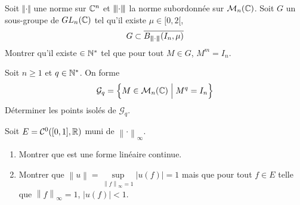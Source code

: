 \documentclass[12pt]{article}
\begin{document}
\begin{exercise}
	Soit $\Vert\cdot\Vert$ une norme sur $\mathbb{C}^{n}$ et ${\left\vert\kern-0.25ex\left\vert\kern-0.25ex\left\vert{}\cdot \right\vert\kern-0.25ex\right\vert\kern-0.25ex\right\vert}$ la norme subordonnée sur $\mathcal{M}_{n}(\mathbb{C})$. Soit $G$ un sous-groupe de $GL_{n}(\mathbb{C})$ tel qu'il existe $\mu\in[0,2[$,
	$$G\subset\overline{B_{{\left\vert\kern-0.25ex\left\vert\kern-0.25ex\left\vert{}\cdot \right\vert\kern-0.25ex\right\vert\kern-0.25ex\right\vert}}(I_{n},\mu)}$$
	Montrer qu'il existe $\in\mathbb{N}^{*}$ tel que pour tout $M\in G$, $M^{m}=I_{n}$.
\end{exercise}

\begin{exercise}
	Soit $n\geqslant1$ et $q\in\mathbb{N}^{*}$. On forme 
	$$\mathcal{G}_{q}=\Bigl\{M\in\mathcal{M}_{n}(\mathbb{C})\Bigm| M^{q}=I_{n}\Bigr\}$$
	Déterminer les points isolés de $\mathcal{G}_{q}$.
\end{exercise}

\begin{exercise}
	Soit $E=\mathcal{C}^{0}([0,1],\mathbb{R})$ muni de $\left\lVert\cdot\right\rVert_{\infty}$.
	\begin{enumerate}
		\item Montrer que  est une forme linéaire continue.
		\item Montrer que $\left\lVert u\right\rVert=\sup\limits_{\left\lVert f\right\rVert_{\infty}=1}\left\lvert u(f)\right\rvert=1$ mais que pour tout $f\in E$ telle que $\left\lVert f\right\rVert_{\infty}=1$, $\left\lvert u(f)\right\rvert<1$.
	\end{enumerate}
\end{exercise}
\end{document}
